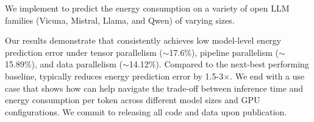 






We implement \sys{} to predict the energy consumption on a variety of open LLM  families (Vicuna, Mistral, Llama, and Qwen) of varying sizes. 

Our results demonstrate that \sys{} consistently achieves low model-level energy prediction error under tensor parallelism ($\sim$17.6\%), pipeline parallelism ($\sim$15.89\%), and data parallelism ($\sim$14.12\%). 
Compared to the next-best performing baseline, \sys{} typically reduces energy prediction error by 1.5-3$\times$.
%
We end with a use case that shows how \sys{} can help navigate the trade-off between inference time and energy consumption per token across different model sizes and GPU configurations. We commit to releasing all code and data upon publication.